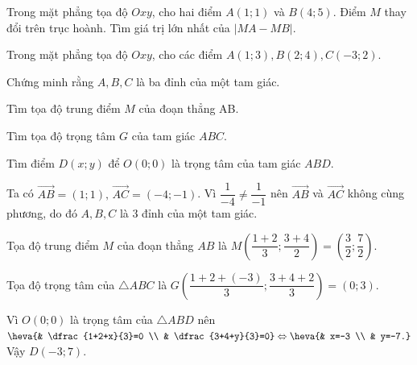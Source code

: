 \begin{bt}%
	Trong mặt phẳng tọa độ $Oxy$, cho hai điểm $A(1;1)$ và $B(4;5)$. Điểm $M$ thay đổi trên trục hoành. Tìm giá trị lớn nhất của $\left|MA-MB\right|$.
\end{bt}

\begin{bt}%
	Trong mặt phẳng tọa độ $Oxy$, cho các điểm $A(1;3),B(2;4),C(-3;2)$.
	\begin{listEX}[1]
		\item Chứng minh rằng $A,B,C$ là ba đỉnh của một tam giác.
		\item Tìm tọa độ trung điểm $M$ của đoạn thẳng AB.
		\item Tìm tọa độ trọng tâm $G$ của tam giác $ABC$.
		\item Tìm điểm $D(x;y)$ để $O(0;0)$ là trọng tâm của tam giác $ABD$.
	\end{listEX}
	\loigiai
	{
		\begin{listEX}[1]
			\item Ta có $\overrightarrow{AB}=(1;1),\, \overrightarrow{AC}=(-4;-1)$. Vì $\dfrac{1}{-4}\ne \dfrac{1}{-1}$ nên $\overrightarrow{AB}$ và $\overrightarrow{AC}$ không cùng phương, do đó $A,B,C$ là 3 đỉnh của một tam giác.
			\item Tọa độ trung điểm $M$ của đoạn thẳng $AB$ là $M\left(\dfrac{1+2}{3};\dfrac{3+4}{2}\right)=\left(\dfrac{3}{2};\dfrac{7}{2}\right)$.
			\item Tọa độ trọng tâm của $\triangle ABC$ là $G\left(\dfrac{1+2+(-3)}{3};\dfrac{3+4+2}{3}\right)=(0;3)$.
			\item Vì $O(0;0)$ là trọng tâm của $\triangle ABD$ nên
			$\heva{& \dfrac{1+2+x}{3}=0 \\ & \dfrac{3+4+y}{3}=0}\Leftrightarrow \heva{& x=-3 \\ & y=-7.}$\\
			Vậy $D(-3;7)$.
		\end{listEX}
	}
\end{bt}

